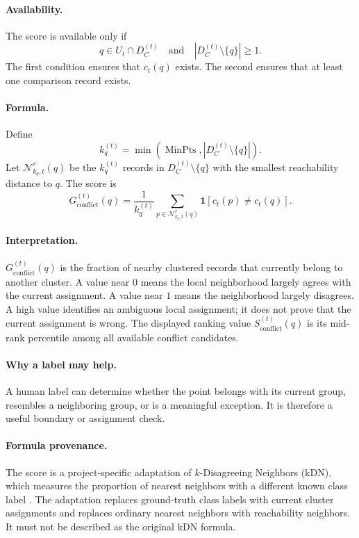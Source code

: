 \documentclass[11pt]{article}
\newcommand{\MinPts}{\operatorname{MinPts}}
\begin{document}
\paragraph{Availability.}
The score is available only if
\begin{equation}
    q\in U_t\cap D_C^{(t)}
    \quad\text{and}\quad
    |D_C^{(t)}\setminus\{q\}|\geq 1.
\end{equation}
The first condition ensures that $c_t(q)$ exists. The second ensures that at
least one comparison record exists.

\paragraph{Formula.}
Define
\begin{equation}
    k_q^{(t)}
    =
    \min\!\left(
        \MinPts,
        |D_C^{(t)}\setminus\{q\}|
    \right).
\end{equation}
Let $\mathcal{N}^{r}_{k_q,t}(q)$ be the $k_q^{(t)}$ records in
$D_C^{(t)}\setminus\{q\}$ with the smallest reachability distance to $q$. The
score is
\begin{equation}
    \boxed{
    G_{\mathrm{conflict}}^{(t)}(q)
    =
    \frac{1}{k_q^{(t)}}
    \sum_{p\in\mathcal{N}^{r}_{k_q,t}(q)}
    \mathbf{1}\!\left[c_t(p)\neq c_t(q)\right]
    }.
\end{equation}
\paragraph{Interpretation.}
$G_{\mathrm{conflict}}^{(t)}(q)$ is the fraction of nearby clustered records
that currently belong to another cluster. A value near $0$ means the local
neighborhood largely agrees with the current assignment. A value near $1$
means the neighborhood largely disagrees. A high value identifies an ambiguous
local assignment; it does not prove that the current assignment is wrong.
The displayed ranking value $S_{\mathrm{conflict}}^{(t)}(q)$ is its mid-rank
percentile among all available conflict candidates.

\paragraph{Why a label may help.}
A human label can determine whether the point belongs with its current group,
resembles a neighboring group, or is a meaningful exception. It is therefore a
useful boundary or assignment check.

\paragraph{Formula provenance.}
The score is a project-specific adaptation of $k$-Disagreeing Neighbors (kDN),
which measures the proportion of nearest neighbors with a different known class
label \cite{smith2014instance}. The adaptation replaces ground-truth class
labels with current cluster assignments and replaces ordinary nearest neighbors
with reachability neighbors. It must not be described as the original kDN
formula.
\end{document}
